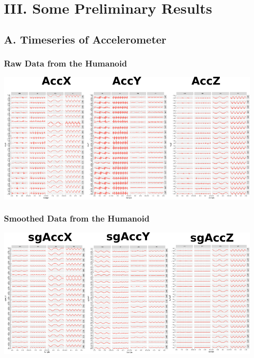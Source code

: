 \documentclass{beamer}
\begin{document}
\section{III. Some Preliminary Results}



\subsection{A. Timeseries of Accelerometer}


\begin{frame}
\frametitle{Raw Data from the Humanoid}


\begin{adjustwidth}{-3em}{-3em}
\includegraphics[width=1.2\textwidth]{RS01}
\end{adjustwidth}

\end{frame}



\begin{frame}
\frametitle{Smoothed Data from the Humanoid}


\begin{adjustwidth}{-3em}{-3em}
\includegraphics[width=1.2\textwidth]{RsgS01}
\end{adjustwidth}

\end{frame}
\end{document}
